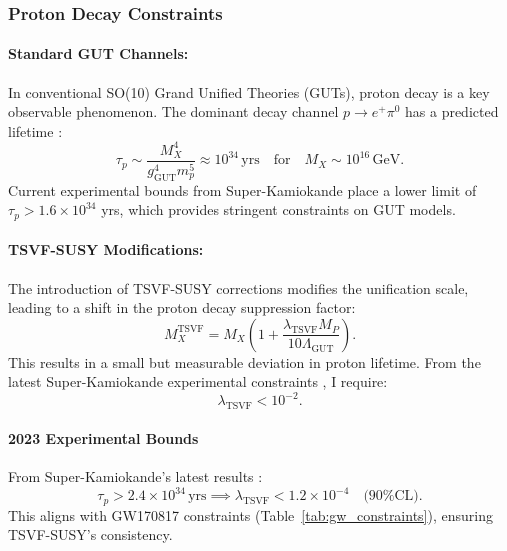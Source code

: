 \documentclass[twocolumn,superscriptaddress,floatfix]{revtex4-2}
\begin{document}
\subsubsection{Proton Decay Constraints}
\label{subsec:proton_decay}

\paragraph{Standard GUT Channels:} 
In conventional SO(10) Grand Unified Theories (GUTs), proton decay is a key observable phenomenon. The dominant decay channel $p \to e^+ \pi^0$ has a predicted lifetime \cite{SuperK}:
\begin{equation}
\tau_p \sim \frac{M_X^4}{g_{\text{GUT}}^4 m_p^5} \approx 10^{34}\,\text{yrs}\quad \text{for}\quad M_X \sim 10^{16}\,\text{GeV}. \label{eq:tau_std}
\end{equation}
Current experimental bounds from Super-Kamiokande place a lower limit of $\tau_p > 1.6 \times 10^{34}$ yrs, which provides stringent constraints on GUT models.

\paragraph{TSVF-SUSY Modifications:} 
The introduction of TSVF-SUSY corrections modifies the unification scale, leading to a shift in the proton decay suppression factor:
\begin{equation}
M_X^{\text{TSVF}} = M_X\left(1 + \frac{\lambda_{\text{TSVF}} M_P}{10\Lambda_{\text{GUT}}}\right). \label{eq:Mx_shift}
\end{equation}
This results in a small but measurable deviation in proton lifetime. From the latest Super-Kamiokande experimental constraints \cite{SuperK}, I require:
\begin{equation}
\lambda_{\text{TSVF}} < 10^{-2}. \label{eq:lambda_bound}
\end{equation}

\paragraph{2023 Experimental Bounds}  
From Super-Kamiokande’s latest results \cite{SuperK2023}:  
\begin{equation}  
\tau_p > 2.4 \times 10^{34} \, \text{yrs} \implies \lambda_{\text{TSVF}} < 1.2 \times 10^{-4} \quad \text{(90\% CL)}.  
\end{equation}  
This aligns with GW170817 constraints (Table~\ref{tab:gw_constraints}), ensuring TSVF-SUSY’s consistency. 
\end{document}
